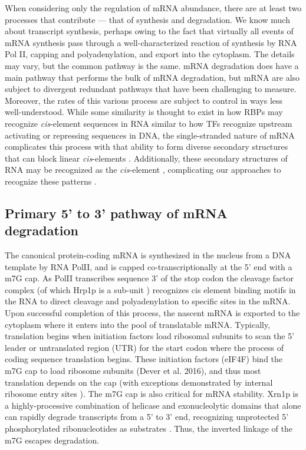 When considering only the regulation of mRNA abundance, 
there are at least two processes that contribute --- that
of synthesis and degradation. We know much about transcript synthesis,
perhaps owing to the fact that virtually all events of mRNA synthesis
pass through a well-characterized reaction of synthesis by RNA Pol II,
capping and polyadenylation, and export into the cytoplasm. The
details may vary, but the common pathway is the same. mRNA
degradation does have a main pathway that performs the bulk of mRNA
degradation, but mRNA are also subject to divergent redundant pathways
that have been challenging to measure. Moreover, the rates of this
various process are subject to control in ways less well-understood.
While some similarity is thought to exist in how RBPs may recognize
\textit{cis}-element sequences in RNA similar to how TFs recognize 
upstream
activating or repressing sequences in DNA, the single-stranded
nature of mRNA complicates this process with that ability to form
diverse secondary structures that can block linear 
\textit{cis}-elements \parencite{li2010predicting}.
Additionally, these secondary
structures of RNA may be recognized as the \textit{cis}-element
\parencite{aviv2003rna,she2017comprehensive}, 
complicating our approaches to recognize these patterns
\parencite{goodarzi2012systematic}.

\subsection{Primary 5' to 3' pathway of mRNA degradation}

The canonical protein-coding mRNA
is synthesized in the nucleus from a DNA template by RNA PolII, and
is capped co-transcriptionally at the 5' end with a m7G cap. As PolII
transcribes sequence 3' of the stop codon the cleavage factor complex
(of which Hrp1p is a sub-unit \parencite{chen1998specific})
recognizes cis element binding motifs in the RNA to direct cleavage
and polyadenylation to specific sites in the mRNA. Upon successful
completion of this process, the nascent mRNA is exported to the
cytoplasm where it enters into the pool of translatable mRNA.
Typically, translation begins when initiation factors load ribosomal
subunits to scan the 5' leader or untranslated region (UTR) for the
start codon where the process of coding sequence translation begins.
These initiation factors (eIF4F) bind the m7G cap to load ribosome
subunits (Dever et al. 2016), and thus most translation depends on the
cap (with exceptions demonstrated by internal ribosome entry sites
\parencite{gilbert2007cap}).
The m7G cap is also critical for mRNA
stability. Xrn1p is a highly-processive combination of helicase and
exonucleolytic domains that alone can rapidly degrade
transcripts from a 5' to 3' end, recognizing unprotected 5'
phosphorylated ribonucleotides as substrates \parencite{parker2012rna}. 
Thus, the inverted linkage of the m7G escapes degradation.  

